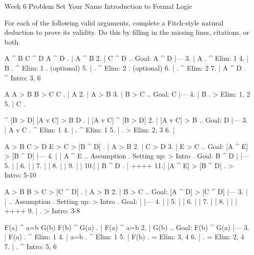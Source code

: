 

\heading
Week 6 Problem Set
Your Name
Introduction to Formal Logic
\endheading

For each of the following valid arguments, complete a Fitch-style natural deduction to prove its validity. Do this by filling in the missing lines, citations, or both.

\problems
{}
\argument
 A ^ B
 C ^ D
\argumentline
 A ^ D
\endargument
	\answer
	. | A ^ B
	 2. | C ^ D  ..  Goal: A ^ D
	    |---
	 3. | A      .  ^ Elim: 1
	 4. | B      .  ^ Elim: 1  .  (optional)
	 5. |        .  ^ Elim: 2  .  (optional)
	 6. |        .  ^ Elim: 2
	 7. | A ^ D  .  ^ Intro: 3, 6
	\endfitchproof
	\endanswer

\argument
 A
 A > B
 B > C
\argumentline
 C
\endargument
	\answer
	. | A
	 2. | A > B
	 3. | B > C  ..  Goal: C
	    |---
	 4. | B      .  > Elim: 1, 2
	 5. | C      .  
	\endfitchproof
	\endanswer

\argument
 [A v C] ^ [B > D]
 [A v C] > B
\argumentline
 D
\endargument
	\answer
	. | [A v C] ^ [B > D]
	 2. | [A v C] > B        ..  Goal: D
	    |---
	 3. | A v C              .  ^ Elim: 1
	 4. |                    .  ^ Elim: 1
	 5. |                    .  > Elim: 2, 3
	 6. | 
	\endfitchproof
	\endanswer

\argument
 A > B
 C > D
 E > C
\argumentline
 [A ^ E] > [B ^ D]
\endargument
	\answer
	. | A > B
	 2. | C > D
	 3. | E > C     ..  Goal: [A ^ E] > [B ^ D]
	    |---
	 4. |  | A ^ E  ..  Assumption  .  Setting up: > Intro  .  Goal: B ^ D
	    |  |---
	 5. |  | 
	 6. |  | 
	 7. |  | 
	 8. |  | 
	 9. |  | 
	 10.|  | B ^ D  .  
	    |  ++++
	 11.| [A ^ E] > [B ^ D]  .  > Intro: 5-10
	\endfitchproof
	\endanswer

\argument
 A > B
 B > C
\argumentline
 [A ^ D] > [C ^ D]
\endargument
	\answer
	. | A > B
	 2. | B > C     ..  Goal: [A ^ D] > [C ^ D]
	    |---
	 3. |  |        ..  Assumption  .  Setting up: > Intro  .  Goal: 
	    |  |---
	 4. |  | 
	 5. |  | 
	 6. |  | 
	 7. |  | 
	 8. |  | 
	    |  ++++
	 9. |           .  > Intro: 3-8
	\endfitchproof
	\endanswer

\argument
 F(a) ^ a=b
 G(b)
\argumentline
 F(b) ^ G(a)
\endargument
	\answer
	. | F(a) ^ a=b
	 2. | G(b)         ..  Goal: F(b) ^ G(a)
	    |---
	 3. | F(a)         .  ^ Elim: 1
	 4. | a=b          .  ^ Elim: 1
	 5. | F(b)         .  = Elim: 3, 4
	 6. |              .  = Elim: 2, 4
	 7. |              .  ^ Intro: 5, 6
	\endfitchproof
	\endanswer

